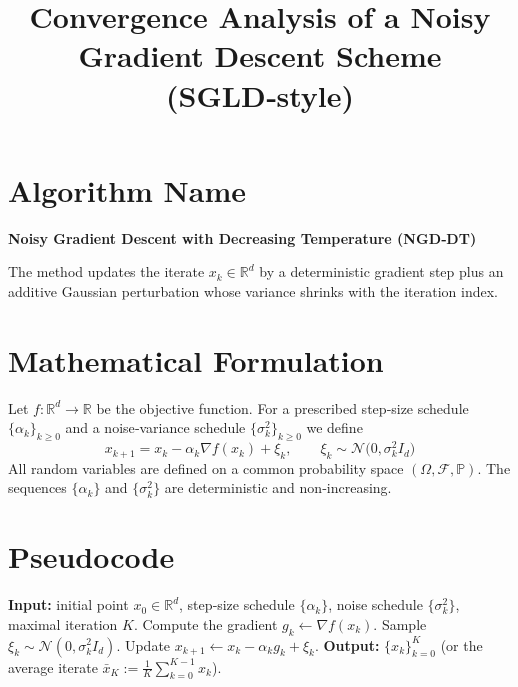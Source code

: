 \documentclass[11pt]{article}
\newcommand{\R}{\mathbb{R}}
\begin{document}
\title{Convergence Analysis of a Noisy Gradient Descent Scheme \\ (SGLD‑style) }
\author{}
\date{}
\maketitle

\section*{Algorithm Name}
\textbf{Noisy Gradient Descent with Decreasing Temperature (NGD‑DT)}  

The method updates the iterate $x_k\in\R^d$ by a deterministic gradient step
plus an additive Gaussian perturbation whose variance shrinks with the
iteration index.

\section*{Mathematical Formulation}
Let $f:\R^d\rightarrow\R$ be the objective function.  
For a prescribed step‑size schedule $\{\alpha_k\}_{k\ge 0}$ and a
noise‑variance schedule $\{\sigma_k^2\}_{k\ge 0}$ we define
\[
\boxed{\;
x_{k+1}=x_k-\alpha_k \nabla f(x_k)+\xi_k,\qquad 
\xi_k\sim\mathcal{N}\!\bigl(0,\sigma_k^2 I_d\bigr)
\;}
\tag{1}
\]
All random variables are defined on a common probability space
$(\Omega,\mathcal{F},\mathbb{P})$.  The sequences $\{\alpha_k\}$ and
$\{\sigma_k^2\}$ are deterministic and non‑increasing.

\section*{Pseudocode}
\begin{algorithm}[H]
\caption{NGD‑DT}
\begin{algorithmic}[1]
\State \textbf{Input:} initial point $x_0\in\R^d$, step‑size schedule
$\{\alpha_k\}$, noise schedule $\{\sigma_k^2\}$, maximal iteration $K$.
    \State Compute the gradient $g_k\gets \nabla f(x_k)$.
    \State Sample $\xi_k\sim\mathcal{N}(0,\sigma_k^2 I_d)$.
    \State Update $x_{k+1}\gets x_k-\alpha_k g_k+\xi_k$.
\EndFor
\State \textbf{Output:} $\{x_k\}_{k=0}^{K}$ (or the average iterate
$\bar x_K:=\frac1K\sum_{k=0}^{K-1}x_k$).
\end{algorithmic}
\end{algorithm}
\end{document}
